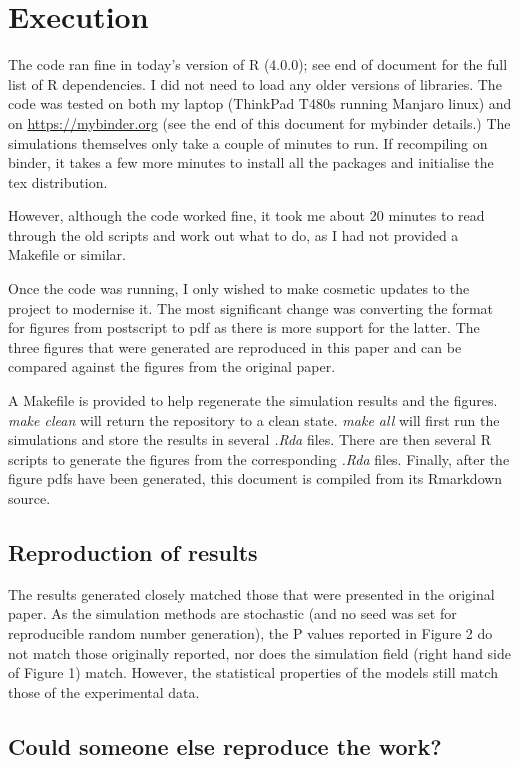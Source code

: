 \section{Execution}

The code ran fine in today's version of R (4.0.0); see end of document
for the full list of R dependencies. I did not need to load any older
versions of libraries. The code was tested on both my laptop (ThinkPad
T480s running Manjaro linux) and on \url{https://mybinder.org} (see the
end of this document for mybinder details.) The simulations themselves
only take a couple of minutes to run. If recompiling on binder, it takes
a few more minutes to install all the packages and initialise the tex
distribution.

However, although the code worked fine, it took me about 20 minutes to
read through the old scripts and work out what to do, as I had not
provided a Makefile or similar.

Once the code was running, I only wished to make cosmetic updates to the
project to modernise it. The most significant change was converting the
format for figures from postscript to pdf as there is more support for
the latter. The three figures that were generated are reproduced in this
paper and can be compared against the figures from the original paper.

A Makefile is provided to help regenerate the simulation results and the
figures. \emph{make clean} will return the repository to a clean state.
\emph{make all} will first run the simulations and store the results in
several \emph{.Rda} files. There are then several R scripts to generate
the figures from the corresponding \emph{.Rda} files. Finally, after the
figure pdfs have been generated, this document is compiled from its
Rmarkdown source.


\subsection{Reproduction of results}

The results generated closely matched those that were presented in the
original paper. As the simulation methods are stochastic (and no seed
was set for reproducible random number generation), the P values
reported in Figure 2 do not match those originally reported, nor does
the simulation field (right hand side of Figure 1) match. However, the
statistical properties of the models still match those of the
experimental data.

\subsection{Could someone else reproduce the work?}

